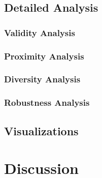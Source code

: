 \documentclass{article}
\begin{document}
\subsection{Detailed Analysis}
\label{subsec:detailed-analysis}

\subsubsection{Validity Analysis}
\label{subsubsec:validity-analysis}


\subsubsection{Proximity Analysis}
\label{subsubsec:proximity-analysis}


\subsubsection{Diversity Analysis}
\label{subsubsec:diversity-analysis}


\subsubsection{Robustness Analysis}
\label{subsubsec:robustness-analysis}


\subsection{Visualizations}
\label{subsec:visualizations}


\section{Discussion}
\label{sec:discussion}
\end{document}
